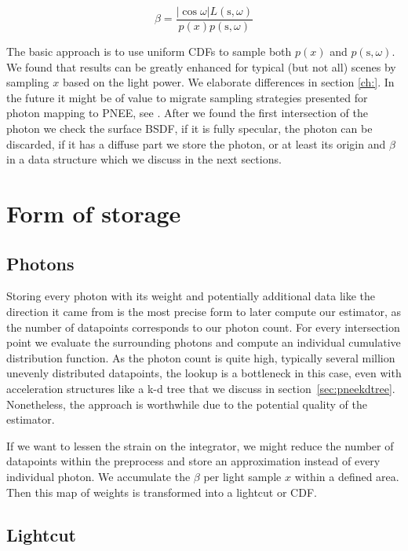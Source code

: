 \begin{equation}\label{eq:beta}
\beta = \frac{|\cos{\omega}|L(\text{s}, \omega)}{p(x)p(\text{s}, \omega)}
\end{equation}

The basic approach is to use uniform CDFs to sample both $p(x)$ and $p(\text{s}, \omega)$. We found that results can be greatly enhanced for typical (but not all) scenes by sampling $x$ based on the light power. We elaborate differences in section \ref{ch:}. In the future it might be of value to migrate sampling strategies presented for photon mapping to PNEE, see \cite{DBLP:conf/rt/SuykensW00}. After we found the first intersection of the photon we check the surface BSDF, if it is fully specular, the photon can be discarded, if it has a diffuse part we store the photon, or at least its origin and $\beta$ in a data structure which we discuss in the next sections.

\section{Form of storage}
\label{ch:formofstorage}

\subsection{Photons}

Storing every photon with its weight and potentially additional data like the direction it came from is the most precise form to later compute our estimator, as the number of datapoints corresponds to our photon count. For every intersection point we evaluate the surrounding photons and compute an individual cumulative distribution function. As the photon count is quite high, typically several million unevenly distributed datapoints, the lookup is a bottleneck in this case, even with acceleration structures like a k-d tree that we discuss in section~\ref{sec:pneekdtree}. Nonetheless, the approach is worthwhile due to the potential quality of the estimator.

If we want to lessen the strain on the integrator, we might reduce the number of datapoints within the preprocess and store an approximation instead of every individual photon. We accumulate the $\beta$ per light sample $x$ within a defined area. Then this map of weights is transformed into a lightcut or CDF.

\subsection{Lightcut}

